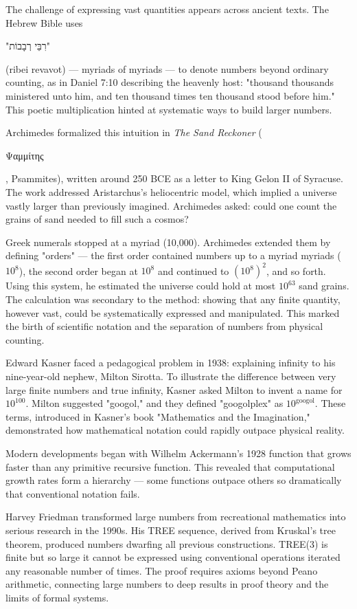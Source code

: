 
\begin{historical}
    The challenge of expressing vast quantities appears across ancient texts. The Hebrew Bible uses \begin{hebrew}"רִבֵּי רְבָבוֹת"\end{hebrew} (ribei revavot) — myriads of myriads — to denote numbers beyond ordinary counting, as in Daniel 7:10 describing the heavenly host: "thousand thousands ministered unto him, and ten thousand times ten thousand stood before him." This poetic multiplication hinted at systematic ways to build larger numbers.

Archimedes formalized this intuition in \textit{The Sand Reckoner} (\begin{greek}Ψαμμίτης\end{greek}, Psammites), written around 250 BCE as a letter to King Gelon II of Syracuse. The work addressed Aristarchus's heliocentric model, which implied a universe vastly larger than previously imagined. Archimedes asked: could one count the grains of sand needed to fill such a cosmos? 

Greek numerals stopped at a myriad (10,000). Archimedes extended them by defining "orders" — the first order contained numbers up to a myriad myriads ($10^8$), the second order began at $10^8$ and continued to $(10^8)^2$, and so forth. Using this system, he estimated the universe could hold at most $10^{63}$ sand grains. The calculation was secondary to the method: showing that any finite quantity, however vast, could be systematically expressed and manipulated. This marked the birth of scientific notation and the separation of numbers from physical counting.

Edward Kasner faced a pedagogical problem in 1938: explaining infinity to his nine-year-old nephew, Milton Sirotta. To illustrate the difference between very large finite numbers and true infinity, Kasner asked Milton to invent a name for $10^{100}$. Milton suggested "googol," and they defined "googolplex" as $10^{\text{googol}}$. These terms, introduced in Kasner's book "Mathematics and the Imagination," demonstrated how mathematical notation could rapidly outpace physical reality.

Modern developments began with Wilhelm Ackermann's 1928 function that grows faster than any primitive recursive function. This revealed that computational growth rates form a hierarchy — some functions outpace others so dramatically that conventional notation fails.

Harvey Friedman transformed large numbers from recreational mathematics into serious research in the 1990s. His TREE sequence, derived from Kruskal's tree theorem, produced numbers dwarfing all previous constructions. TREE(3) is finite but so large it cannot be expressed using conventional operations iterated any reasonable number of times. The proof requires axioms beyond Peano arithmetic, connecting large numbers to deep results in proof theory and the limits of formal systems.
\end{historical}